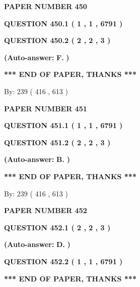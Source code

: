 \documentclass[12pt]{article}
\begin{document}
   
 {\textbf{ \Large{ PAPER NUMBER  450  }}}
   
   
   
   
  
  
{\textbf{\large{QUESTION
450.1 
 ( 1 , 1 , 6791 )
}}}
  
  
{\textbf{\large{QUESTION
450.2 
 ( 2 , 2 , 3 )
}}}
 
 
{\textbf{(Auto-answer:}}
{\textbf{\large{
F.}}}
{\textbf{)}}
 
 
   
   
   
   
\vspace{1.0in} 
{\textbf{\large{ *** END OF PAPER, THANKS *** }}} 
   
   
\hspace{1.0in} By: 
 239 ( 416 ,  613 )
   
   
   
   
\newpage 
\setcounter{page}{ 
   451001 } 
   
   
 {\textbf{ \Large{ PAPER NUMBER  451  }}}
   
   
   
   
  
  
{\textbf{\large{QUESTION
451.1 
 ( 1 , 1 , 6791 )
}}}
  
  
{\textbf{\large{QUESTION
451.2 
 ( 2 , 2 , 3 )
}}}
 
 
{\textbf{(Auto-answer:}}
{\textbf{\large{
B.}}}
{\textbf{)}}
 
 
   
   
   
   
\vspace{1.0in} 
{\textbf{\large{ *** END OF PAPER, THANKS *** }}} 
   
   
\hspace{1.0in} By: 
 239 ( 416 ,  613 )
   
   
   
   
\newpage 
\setcounter{page}{ 
   452001 } 
   
   
 {\textbf{ \Large{ PAPER NUMBER  452  }}}
   
   
   
   
  
  
{\textbf{\large{QUESTION
452.1 
 ( 2 , 2 , 3 )
}}}
 
 
{\textbf{(Auto-answer:}}
{\textbf{\large{
D.}}}
{\textbf{)}}
 
 
  
  
{\textbf{\large{QUESTION
452.2 
 ( 1 , 1 , 6791 )
}}}
   
   
   
   
\vspace{1.0in} 
{\textbf{\large{ *** END OF PAPER, THANKS *** }}} 
   
\end{document}
